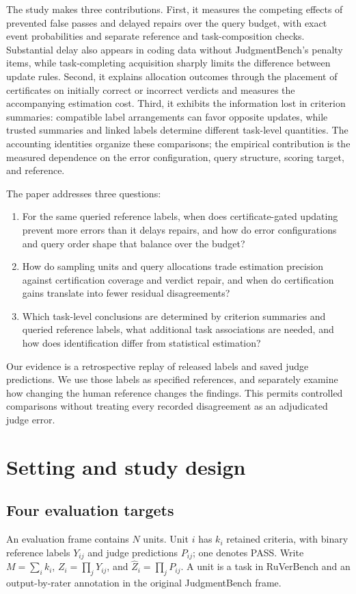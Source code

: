 \documentclass[10pt,letterpaper]{article}
\begin{document}
The study makes three contributions. First, it measures the competing effects of prevented false passes and delayed repairs over the query budget, with exact event probabilities and separate reference and task-composition checks. Substantial delay also appears in coding data without JudgmentBench's penalty items, while task-completing acquisition sharply limits the difference between update rules. Second, it explains allocation outcomes through the placement of certificates on initially correct or incorrect verdicts and measures the accompanying estimation cost. Third, it exhibits the information lost in criterion summaries: compatible label arrangements can favor opposite updates, while trusted summaries and linked labels determine different task-level quantities. The accounting identities organize these comparisons; the empirical contribution is the measured dependence on the error configuration, query structure, scoring target, and reference.

The paper addresses three questions:
\begin{enumerate}[label=\textbf{RQ\arabic*.}]
\item For the same queried reference labels, when does certificate-gated updating prevent more errors than it delays repairs, and how do error configurations and query order shape that balance over the budget?
\item How do sampling units and query allocations trade estimation precision against certification coverage and verdict repair, and when do certification gains translate into fewer residual disagreements?
\item Which task-level conclusions are determined by criterion summaries and queried reference labels, what additional task associations are needed, and how does identification differ from statistical estimation?
\end{enumerate}
Our evidence is a retrospective replay of released labels and saved judge predictions. We use those labels as specified references, and separately examine how changing the human reference changes the findings. This permits controlled comparisons without treating every recorded disagreement as an adjudicated judge error.

\section{Setting and study design}\label{sec:setting}
\subsection{Four evaluation targets}
An evaluation frame contains $N$ units. Unit $i$ has $k_i$ retained criteria, with binary reference labels $Y_{ij}$ and judge predictions $P_{ij}$; one denotes PASS. Write $M=\sum_i k_i$, $Z_i=\prod_jY_{ij}$, and $\widehat Z_i=\prod_jP_{ij}$. A unit is a task in RuVerBench and an output-by-rater annotation in the original JudgmentBench frame.
\end{document}
